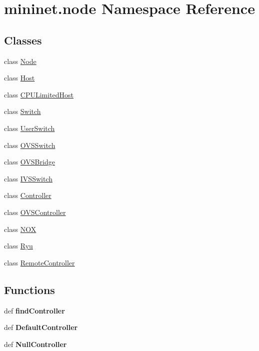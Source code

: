 \hypertarget{namespacemininet_1_1node}{\section{mininet.\-node Namespace Reference}
\label{namespacemininet_1_1node}
}
\subsection*{Classes}
\begin{DoxyCompactItemize}
\item 
class \hyperlink{classmininet_1_1node_1_1Node}{Node}
\item 
class \hyperlink{classmininet_1_1node_1_1Host}{Host}
\item 
class \hyperlink{classmininet_1_1node_1_1CPULimitedHost}{C\-P\-U\-Limited\-Host}
\item 
class \hyperlink{classmininet_1_1node_1_1Switch}{Switch}
\item 
class \hyperlink{classmininet_1_1node_1_1UserSwitch}{User\-Switch}
\item 
class \hyperlink{classmininet_1_1node_1_1OVSSwitch}{O\-V\-S\-Switch}
\item 
class \hyperlink{classmininet_1_1node_1_1OVSBridge}{O\-V\-S\-Bridge}
\item 
class \hyperlink{classmininet_1_1node_1_1IVSSwitch}{I\-V\-S\-Switch}
\item 
class \hyperlink{classmininet_1_1node_1_1Controller}{Controller}
\item 
class \hyperlink{classmininet_1_1node_1_1OVSController}{O\-V\-S\-Controller}
\item 
class \hyperlink{classmininet_1_1node_1_1NOX}{N\-O\-X}
\item 
class \hyperlink{classmininet_1_1node_1_1Ryu}{Ryu}
\item 
class \hyperlink{classmininet_1_1node_1_1RemoteController}{Remote\-Controller}
\end{DoxyCompactItemize}
\subsection*{Functions}
\begin{DoxyCompactItemize}
\item 
\hypertarget{namespacemininet_1_1node_ad44d5d78a523aa8f8f075fcc7a1f3df5}{def {\bfseries find\-Controller}}\label{namespacemininet_1_1node_ad44d5d78a523aa8f8f075fcc7a1f3df5}

\item 
\hypertarget{namespacemininet_1_1node_a16a440bd7f67d518351000fd1749f7d9}{def {\bfseries Default\-Controller}}\label{namespacemininet_1_1node_a16a440bd7f67d518351000fd1749f7d9}

\item 
\hypertarget{namespacemininet_1_1node_a5d48f4b8d8ffa88e0c4cbd52ee196416}{def {\bfseries Null\-Controller}}\label{namespacemininet_1_1node_a5d48f4b8d8ffa88e0c4cbd52ee196416}

\end{DoxyCompactItemize}
